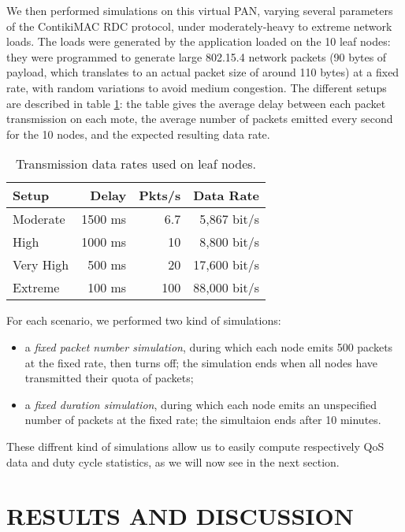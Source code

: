 \documentclass[a4paper,twoside]{article}
\begin{document}
We then performed simulations on this virtual PAN, varying several parameters
of the ContikiMAC RDC protocol, under moderately-heavy to extreme network
loads. The loads were generated by the application loaded on the 10 leaf
nodes: they were programmed to generate large 802.15.4 network packets
(90 bytes of payload, which translates to an actual packet size of
around 110 bytes) at a fixed rate, with random variations to avoid
medium congestion. The different setups are described in table
\ref{TblDataRates}: the table gives the average delay between
each packet transmission on each mote, the average number of
packets emitted every second for the 10 nodes, and the expected
resulting data rate.

\begin{table}[htb]
\centering
\begin{tabular}{|l|r|r|r|}
\hline
Setup     &  Delay  & Pkts/s & Data Rate \\
\hline
Moderate  & 1500 ms &   6.7  &  5,867 bit/s \\ 
High      & 1000 ms &  10    &  8,800 bit/s \\
Very High &  500 ms &  20    & 17,600 bit/s \\
Extreme   &  100 ms & 100    & 88,000 bit/s \\
\hline
\end{tabular}
\caption{Transmission data rates used on leaf nodes.}
\label{TblDataRates}
\end{table}

For each scenario, we performed two kind of simulations:
\begin{itemize}
\item a \emph{fixed packet number simulation}, during which each node emits
500 packets at the fixed rate, then turns off; the simulation ends when all
nodes have transmitted their quota of packets;

\item a \emph{fixed duration simulation}, during which each node emits an
unspecified number of packets at the fixed rate; the simultaion ends after
10 minutes.
\end{itemize}

These diffrent kind of simulations allow us to easily compute respectively
QoS data and duty cycle statistics, as we will now see in the next section.



\section{\uppercase{Results and Discussion}}
\end{document}
